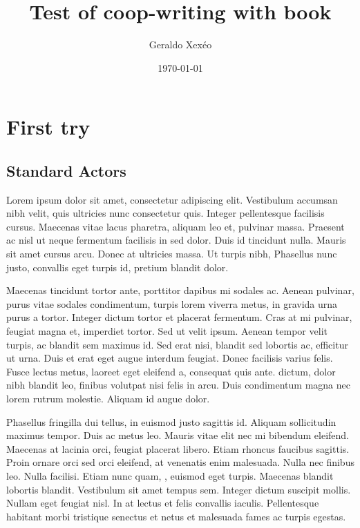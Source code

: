 \documentclass[12pt,a4paper]{book}
\author{Geraldo Xexéo}
\date{\today}
\title{Test of coop-writing with book}
\begin{document}
\maketitle
\chapter{First try}
\section{Standard Actors}

Lorem ipsum dolor sit amet, consectetur adipiscing elit. Vestibulum accumsan nibh velit, quis ultricies nunc consectetur quis. Integer pellentesque facilisis cursus. Maecenas vitae lacus pharetra, aliquam leo et, pulvinar massa. Praesent ac nisl ut neque fermentum facilisis in sed dolor. Duis id tincidunt nulla. Mauris sit amet cursus arcu. Donec at ultricies massa. Ut turpis nibh,  Phasellus nunc justo, convallis eget turpis id, pretium blandit dolor.

Maecenas tincidunt tortor ante, porttitor dapibus mi sodales ac. Aenean pulvinar, purus vitae sodales condimentum, turpis lorem viverra metus, in gravida urna purus a tortor. Integer dictum tortor et placerat fermentum. Cras at mi pulvinar, feugiat magna et, imperdiet tortor. Sed ut velit ipsum. Aenean tempor velit turpis, ac blandit sem maximus id. Sed erat nisi, blandit sed lobortis ac, efficitur ut urna. Duis et erat eget augue interdum feugiat. Donec facilisis varius felis. Fusce lectus metus, laoreet eget eleifend a, consequat quis ante.  dictum, dolor nibh blandit leo, finibus volutpat nisi felis in arcu. Duis condimentum magna nec lorem rutrum molestie. Aliquam id augue dolor.

Phasellus fringilla dui tellus, in euismod justo sagittis id. Aliquam sollicitudin maximus tempor. Duis ac metus leo. Mauris vitae elit nec mi bibendum eleifend. Maecenas at lacinia orci, feugiat placerat libero. Etiam rhoncus faucibus sagittis. Proin ornare orci sed orci eleifend, at venenatis enim malesuada. Nulla nec finibus leo. Nulla facilisi. Etiam nunc quam, , euismod eget turpis. Maecenas blandit lobortis blandit. Vestibulum sit amet tempus sem. Integer dictum suscipit mollis. Nullam eget feugiat nisl. In at lectus et felis convallis iaculis. Pellentesque habitant morbi tristique senectus et netus et malesuada fames ac turpis egestas.
\end{document}
